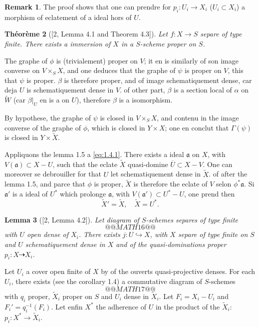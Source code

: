\documentclass[11pt,a4paper]{article}
\theoremstyle{plain}
\newtheorem{theorem}{Th\'eor\`eme}
\newtheorem{lemma}[theorem]{Lemma}
\theoremstyle{definition}
\newtheorem{remark}[theorem]{Remark}
\begin{document}
\begin{remark}
The proof shows that one can prendre for $p_i: U_i \to X_i$ ($U_i \subset X_i$) a morphism of eclatement of a ideal hors of $U$.
\end{remark}

\begin{theorem}[{[2, Lemma 4.1 and Theorem 4.3]}]
Let $f: X \to S$ separe of type finite. There exists a immersion of $X$ in a $S$-scheme proper on $S$.
\end{theorem}

The graphe of $\phi$ is (trivialement) proper on $V$; it en is similarly of son image converse on $V \times_S X$, and one deduces that the graphe of $\psi$ is proper on $V$, this that $\psi$ is proper. $\beta$ is therefore proper, and of image schematiquement dense, car deja $U$ is schematiquement dense in $V$. of other part, $\beta$ is a section local of $\alpha$ on $\widetilde{W}$ (car $\beta|_U$ en is a on $U$), therefore $\beta$ is a isomorphism.

By hypothese, the graphe of $\psi$ is closed in $V \times_S X$, and contenu in the image converse of the graphe of $\phi$, which is closed in $Y \times X$; one en conclut that $\Gamma(\psi)$ is closed in $Y \times \widetilde{X}$.

Appliquons the lemma 1.5 a \eqref{eq:1.4.1}. There exists a ideal $\mathfrak{a}$ on $X$, with $V(\mathfrak{a}) \subset X - U$, such that the eclate $\widetilde{X}$ quasi-domine $\overline{U} \subset X - V$. One can moreover se debrouiller for that $U$ let schematiquement dense in $\widetilde{X}$. of after the lemma 1.5, and parce that $\phi$ is proper, $\widetilde{X}$ is therefore the eclate of $V$ selon $\phi^*\mathfrak{a}$. Si $\mathfrak{a}'$ is a ideal of $U^*$ which prolonge $\mathfrak{a}$, with $V(\mathfrak{a}') \subset U^* - U$, one prend then
\[
\widetilde{X}' = \widetilde{X}, \quad \widetilde{X} = U^*.
\]

\begin{lemma}[{[2, Lemma 4.2]}]
Let diagram of $S$-schemes separes of type finite
\[
@@MATH16@@
\]
with $U$ open dense of $X_i$. There exists $j: U \hookrightarrow X$, with $X$ separe of type finite on $S$ and $U$ schematiquement dense in $X$ and of the quasi-dominations proper $p_i: X \dashrightarrow X_i$.
\end{lemma}

Let $U_i$ a cover open finite of $X$ by of the ouverts quasi-projective denses. For each $U_i$, there exists (see the corollary 1.4) a commutative diagram of $S$-schemes
\[
@@MATH17@@
\]
with $q_i$ proper, $\widetilde{X}_i$ proper on $S$ and $U_i$ dense in $\widetilde{X}_i$. Let $F_i = X_i - U_i$ and $F_i' = q_i^{-1}(F_i)$. Let enfin $X^*$ the adherence of $U$ in the product of the $\widetilde{X}_i$: $p_i: X^* \to \widetilde{X}_i$.
\end{document}
